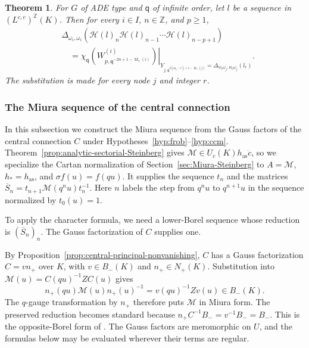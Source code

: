 \documentclass[11pt,leqno]{amsart}
\numberwithin{equation}{section}
\theoremstyle{plain}
\newtheorem{theorem}{Theorem}[section]
\theoremstyle{definition}
\theoremstyle{plain}
\theoremstyle{definition}
\theoremstyle{remark}
\newcommand{\qaff}{\mathsf q}
\begin{document}
\begin{theorem}\label{thm:discrete-Miura-character}
For $G$ of ADE type and $\qaff$ of infinite order, let $l$ be a sequence in $(L^{c,e})^{\mathbb Z}(K)$.  Then for every $i\in I$, $n\in\mathbb Z$, and $p\ge1$,
\begin{equation}\label{eq:fundamental-qchar-component}
 \begin{aligned}
 &\Delta_{\omega_i,\omega_i}\!\left(
   \mathcal H(l)_n\mathcal H(l)_{n-1}\cdots\mathcal H(l)_{n-p+1}\right)\\
 &\quad=\left.\chi_{\qaff}\!\left(
       W^{(i)}_{p,\qaff^{-2n+1-\operatorname{ht}_c(i)}}\right)\right|_
 {Y_{j,\qaff^{2(\mathfrak m_j-r)+1-\operatorname{ht}_c(j)}}
            =\Delta_{w_0\omega_j,w_0\omega_j}(l_r)} .
 \end{aligned}
\end{equation}
The substitution is made for every node $j$ and integer $r$.
\end{theorem}

\subsubsection{The Miura sequence of the central connection}\label{sec:central-Miura-sequence}
In this subsection we construct the Miura sequence from the Gauss factors of the central connection $C$ under Hypotheses~\ref{hyp:frob}--\ref{hyp:ccm}.  Theorem~\ref{prop:analytic-sectorial-Steinberg} gives $\mathscr M\in U_c(K)h_{\mathrm{as}}\dot c$, so we specialize the Cartan normalization of Section~\ref{sec:Miura-Steinberg} to $A=\mathscr M$, $h_*=h_{\mathrm{as}}$, and $\sigma f(u)=f(qu)$.  It supplies the sequence $t_n$ and the matrices $\overline S_n=t_{n+1}\mathscr M(q^nu)t_n^{-1}$.  Here $n$ labels the step from $q^nu$ to $q^{n+1}u$ in the sequence normalized by $t_0(u)=1$.

To apply the character formula, we need a lower-Borel sequence whose reduction is $(\overline S_n)_n$. The Gauss factorization of $C$ supplies one.

By Proposition~\ref{prop:central-principal-nonvanishing}, $C$ has a Gauss factorization $C=vn_+$ over $K$, with $v\in B_-(K)$ and $n_+\in N_+(K)$.  Substitution into $\mathscr M(u)=C(qu)^{-1}ZC(u)$ gives
\begin{equation}\label{eq:Wronskian-Miura-gauge}
 n_+(qu)\mathscr M(u)n_+(u)^{-1}
     =v(qu)^{-1}Zv(u)\in B_-(K).
\end{equation}
The $q$-gauge transformation by $n_+$ therefore puts $\mathscr M$ in Miura form. The preserved reduction becomes standard because $n_+C^{-1}B_-=v^{-1}B_-=B_-$.  This is the opposite-Borel form of \cite[Corollary~3.4]{FKSZ2020}. The Gauss factors are meromorphic on $U$, and the formulas below may be evaluated wherever their terms are regular.
\end{document}
